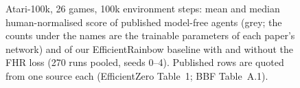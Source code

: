 \begin{figure}[t]
  \centering
  
  \caption{Atari-100k, 26 games, 100k environment steps: mean and median human-normalised score of published model-free agents (grey; the counts under the names are the trainable parameters of each paper's network) and of our EfficientRainbow baseline with and without the FHR loss (270 runs pooled, seeds 0--4). Published rows are quoted from one source each (EfficientZero Table~1; BBF Table~A.1).}
  \label{fig:atari100k-model-free}
\end{figure}
